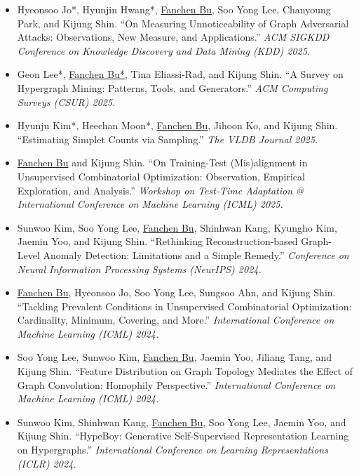 \documentclass{resume}
\begin{document}
\begin{itemize}[parsep=0.5ex]
  \item [{[C12]}] 
  Hyeonsoo Jo*, Hyunjin Hwang*, \underline{Fanchen Bu}, Soo Yong Lee, Chanyoung Park, and Kijung Shin.
  ``On Measuring Unnoticeability of Graph Adversarial Attacks: Observations, New Measure, and Applications.''
  \textit{ACM SIGKDD Conference on Knowledge Discovery and Data Mining (KDD) 2025.}    

  \item [{[J4]}] 
  Geon Lee*, \underline{Fanchen Bu*}, Tina Eliassi-Rad, and Kijung Shin.
  ``A Survey on Hypergraph Mining: Patterns, Tools, and Generators.''
  \textit{ACM Computing Surveys (CSUR) 2025.}
  
  \item [{[J3]}] 
  Hyunju Kim*, Heechan Moon*, \underline{Fanchen Bu}, Jihoon Ko, and Kijung Shin.
  ``Estimating Simplet Counts via Sampling.''
  \textit{The VLDB Journal 2025.}

  \item [{[W1]}]
  \underline{Fanchen Bu} and Kijung Shin.
  ``On Training-Test (Mis)alignment in Unsupervised Combinatorial Optimization: Observation, Empirical Exploration, and Analysis.''
  \textit{Workshop on Test-Time Adaptation @ International Conference on Machine Learning (ICML) 2025.}

  \item [{[C11]}]
  Sunwoo Kim, Soo Yong Lee, \underline{Fanchen Bu}, Shinhwan Kang, Kyungho Kim, Jaemin Yoo, and Kijung Shin.
  ``Rethinking Reconstruction-based Graph-Level Anomaly Detection: Limitations and a Simple Remedy.''
  \textit{Conference on Neural Information Processing Systems (NeurIPS) 2024.}
  
  \item [{[C10]}]
  \underline{Fanchen Bu}, Hyeonsoo Jo, Soo Yong Lee, Sungsoo Ahn, and Kijung Shin.
  ``Tackling Prevalent Conditions in Unsupervised Combinatorial Optimization: Cardinality, Minimum, Covering, and More.''
  \textit{International Conference on Machine Learning (ICML) 2024.}
  
  \item [{[C9]}]
  Soo Yong Lee, Sunwoo Kim, \underline{Fanchen Bu}, Jaemin Yoo, Jiliang Tang, and Kijung Shin.
  ``Feature Distribution on Graph Topology Mediates the Effect of Graph Convolution: Homophily Perspective.''
  \textit{International Conference on Machine Learning (ICML) 2024.}

  \item [{[C8]}]
  Sunwoo Kim, Shinhwan Kang, \underline{Fanchen Bu}, Soo Yong Lee, Jaemin Yoo, and Kijung Shin.
  ``HypeBoy: Generative Self-Supervised Representation Learning on Hypergraphs.''
  \textit{International Conference on Learning Representations (ICLR) 2024.}
  

\end{itemize}
\end{document}

